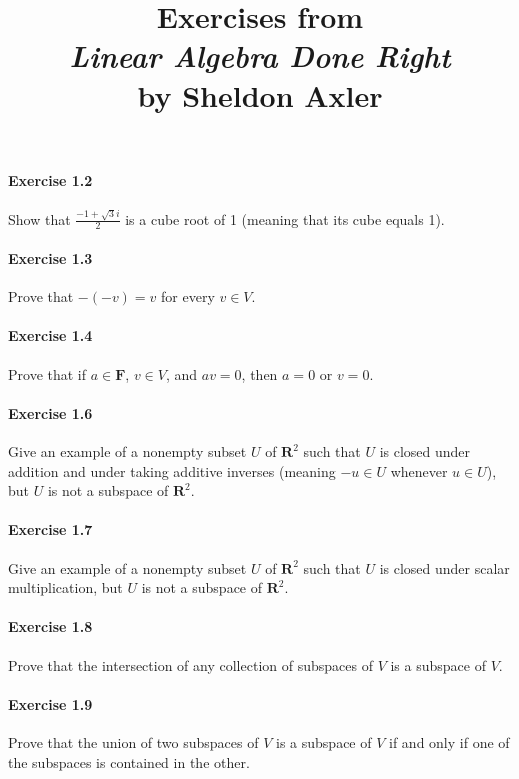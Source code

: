\documentclass{article}
\title{\textbf{
Exercises from \\
\textit{Linear Algebra Done Right} \\
by Sheldon Axler
}}
\date{}
\begin{document}
\maketitle

\paragraph{Exercise 1.2} Show that $\frac{-1 + \sqrt{3}i}{2}$ is a cube root of 1 (meaning that its cube equals 1).

\paragraph{Exercise 1.3} Prove that $-(-v) = v$ for every $v \in V$.

\paragraph{Exercise 1.4} Prove that if $a \in \mathbf{F}$, $v \in V$, and $av = 0$, then $a = 0$ or $v = 0$.

\paragraph{Exercise 1.6} Give an example of a nonempty subset $U$ of $\mathbf{R}^2$ such that $U$ is closed under addition and under taking additive inverses (meaning $-u \in U$ whenever $u \in U$), but $U$ is not a subspace of $\mathbf{R}^2$.

\paragraph{Exercise 1.7} Give an example of a nonempty subset $U$ of $\mathbf{R}^2$ such that $U$ is closed under scalar multiplication, but $U$ is not a subspace of $\mathbf{R}^2$.

\paragraph{Exercise 1.8} Prove that the intersection of any collection of subspaces of $V$ is a subspace of $V$.

\paragraph{Exercise 1.9} Prove that the union of two subspaces of $V$ is a subspace of $V$ if and only if one of the subspaces is contained in the other.
\end{document}
